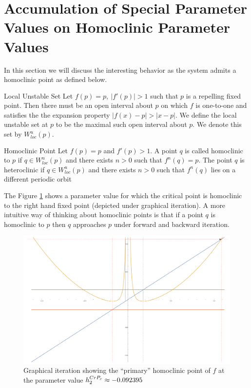 \section{Accumulation of Special Parameter Values on Homoclinic Parameter Values}\label{hcs}
			In this section we will discuss the interesting behavior as the system admits a homoclinic point as defined below.

			\begin{mydef}{Local Unstable Set\cite{Dev2}}
			Let $f (p) = p, \ |f' (p)| > 1$ such that $p$ is a repelling fixed point. Then there must be an open interval about $p$ on which $f$ is one-to-one and satisfies the the expansion property $|f (x) - p| > |x - p|$. We define the local unstable set at $p$ to be the maximal such open interval about $p$. We denote this set by $W^u_{loc} (p)$.
			\end{mydef}

			\begin{mydef}{Homoclinic Point\cite{Dev2}}
			Let $f (p) = p$ and $f' (p) > 1$. A point $q$ is called homoclinic to $p$ if $q \in W^u_{loc} (p)$ and there exists $n > 0$ such that $f^n (q) = p$. The point $q$ is heteroclinic if $q \in W^u_{loc} (p)$ and there exists $n > 0$ such that $f^n (q)$ lies on a different periodic orbit
			\end{mydef}

			The Figure \ref{hc} shows a parameter value for which the critical point is homoclinic to the right hand fixed point (depicted under graphical iteration). A more intuitive way of thinking about homoclinic points is that if a point $q$ is homoclinic to $p$ then $q$ approaches $p$ under forward and backward iteration.
			\begin{figure}[h]
				\centering
				\includegraphics[width=.75\columnwidth]{./img/homoclinic.pdf}%
				\caption{Graphical iteration showing the ``primary'' homoclinic point of $f$ at the parameter value $h^{CrP_c}_2 \approx -0.092395$}
				\label{hc}%
			\end{figure}

